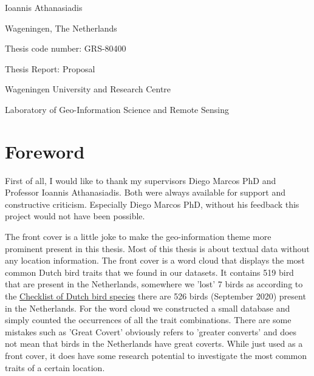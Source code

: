 \documentclass[a4paper, 12pt, oneside]{book} %
\begin{document}
\begin{titlingpage}
\begin{center}
  {Ioannis Athanasiadis}\vspace{3.0cm}
  
  
  
  \end{center}
  
  \begin{center}
    {\thedate}
  
    {Wageningen, The Netherlands}
  \end{center}\vspace{5cm}

    Thesis code number: GRS-80400
  
    Thesis Report: Proposal
  
    {Wageningen University and Research Centre}
  
    {Laboratory of Geo-Information Science and Remote Sensing}
 \end{titlingpage}
\graphicspath{ {./figures/} }

\newpage
\thispagestyle{empty}
\section*{Foreword}
First of all, I would like to thank my supervisors Diego Marcos PhD and Professor Ioannis Athanasiadis.
Both were always available for support and constructive criticism.
Especially Diego Marcos PhD, without his feedback this project would not have been possible.
\newline

\noindent
The front cover is a little joke to make the geo-information theme more prominent present in this thesis. 
Most of this thesis is about textual data without any location information.
The front cover is a word cloud that displays the most common Dutch bird traits that we found in our datasets. 
It contains 519 bird that are present in the Netherlands, somewhere we 'lost' 7 birds as according to the \href{https://avibase.bsc-eoc.org/checklist.jsp?region=NL&list=howardmoore}{Checklist of Dutch bird species} there are   526 birds (September 2020) present in the Netherlands.
For the word cloud we constructed a small database and simply counted the occurrences of all the trait combinations.
There are some mistakes such as 'Great Covert' obviously refers to 'greater converts' and does not mean that birds in the Netherlands have great coverts.  
While just used as a front cover, it does have some research potential to investigate the most common traits of a certain location.
\end{document}
